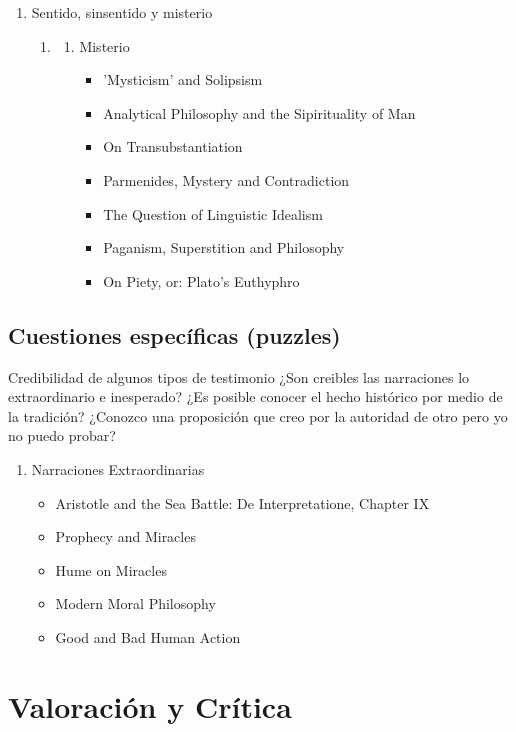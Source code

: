 \documentclass[11pt]{article}
\begin{document}
\begin{enumerate}
\item Sentido, sinsentido y misterio
\label{sec-4-1-3-7}
\begin{enumerate}
\item{}
\label{sec-4-1-3-7-1}
\begin{enumerate}
\item Misterio
\label{sec-4-1-3-7-1-1}
\begin{itemize}
\item 'Mysticism' and Solipsism
\item Analytical Philosophy and the Sipirituality of Man
\item On Transubstantiation
\item Parmenides, Mystery and Contradiction
\item The Question of Linguistic Idealism
\item Paganism, Superstition and Philosophy
\item On Piety, or: Plato's Euthyphro
\end{itemize}
\end{enumerate}
\end{enumerate}
\end{enumerate}


\subsection{Cuestiones específicas (puzzles)}
\label{sec-4-2}
Credibilidad de algunos tipos de testimonio
¿Son creibles las narraciones lo extraordinario e inesperado?
¿Es posible conocer el hecho histórico por medio de la tradición?
¿Conozco una proposición que creo por la autoridad de otro pero yo no puedo probar?
\begin{enumerate}
\item Narraciones Extraordinarias
\label{sec-4-2-0-1}
\begin{itemize}
\item Aristotle and the Sea Battle: De Interpretatione, Chapter IX
\item Prophecy and Miracles
\item Hume on Miracles
\item Modern Moral Philosophy
\item Good and Bad Human Action
\end{itemize}
\end{enumerate}

\section{Valoración y Crítica}
\label{sec-5}
\end{document}
